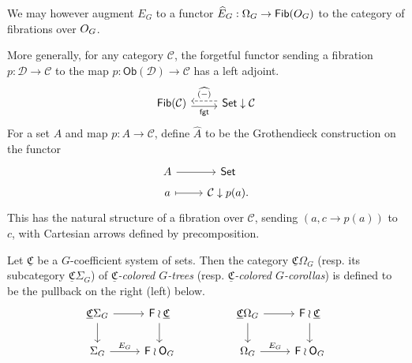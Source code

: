\documentclass[a4paper,10pt
]{article}%
\newcommand{\UC}{\underline{\mathfrak C}}
\renewcommand{\1}{\ensuremath{\mathbb{id}}}
\renewcommand{\hat}{\widehat}
\begin{document}
We may however augment $E_G$ to a functor
$\hat E_G: \Omega_G \to \mathsf{Fib}(\mathsf \mathsf O_G)$
to the category of fibrations over $\mathsf \mathsf O_G$.

More generally, for any category $\mathcal C$, the forgetful functor
sending a fibration $p: \mathcal D \to \mathcal C$ to the map $p: \mathsf{Ob}(\mathcal D) \to \mathcal C$
has a left adjoint.
\begin{equation}
      \label{FIB_HAT_EQ}
      \begin{tikzcd}
            \mathsf{Fib}(\mathcal C) \arrow[r, shift right, "\mathsf{fgt}"']
            &
            \mathsf{Set} \downarrow \mathcal C \arrow[l, shift right, dashed, "\hat{(-)}"']
      \end{tikzcd}
\end{equation}
For a set $A$ and map $p: A \to \mathcal C$, define
$\hat A$ to be the Grothendieck construction on the functor
\begin{equation}
      \begin{tikzcd}[row sep = tiny]
            A \arrow[r]
            &
            \mathsf{Set}
            \\
            a \arrow[r, mapsto]
            &
            \mathcal C \downarrow p(a).
      \end{tikzcd}
\end{equation}
This has the natural structure of a fibration over $\mathcal C$,
sending $(a, c \to p(a))$ to $c$, with
Cartesian arrows defined by precomposition.


\begin{definition}
      Let $\underline{\mathfrak C}$ be a $G$-coefficient system of sets.
      Then the category $\underline{\mathfrak C}\Omega_G$ (resp. its subcategory $\UC \Sigma_G$)
      of \textit{$\underline{\mathfrak C}$-colored $G$-trees}
      (resp. \textit{$\UC$-colored $G$-corollas})
      is defined to be the pullback on the right (left) below.
      \begin{equation}
            \label{COMEGAG_OG_EQ}
            \begin{tikzcd}
                  \UC \Sigma_G \arrow[d] \arrow[r]
                  &
                  \mathsf F \wr \UC \arrow[d]
                  &&
                  \UC \Omega_G \arrow[d] \arrow[r]
                  &
                  \mathsf F \wr \underline{\mathfrak C} \arrow[d]
                  \\
                  \Sigma_G \arrow[r, "E_G"]
                  &
                  \mathsf F \wr \mathsf O_G
                  &&
                  \Omega_G \arrow[r, "E_G"]
                  &
                  \mathsf F \wr \mathsf O_G
            \end{tikzcd}
      \end{equation}
\end{definition}
\end{document}
